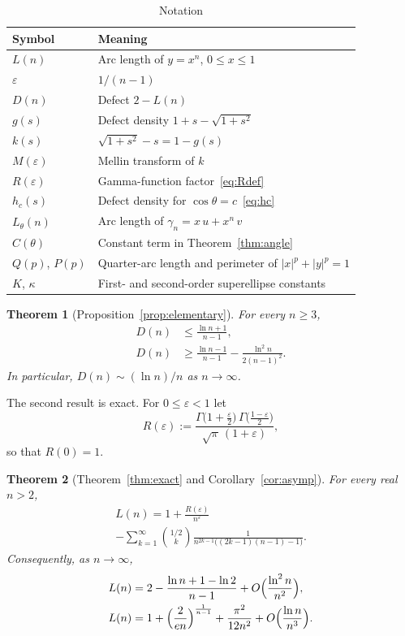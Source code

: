 \documentclass[journal]{IEEEtran}
\newtheorem{mainthm}{Theorem}
\newcommand{\eps}{\varepsilon}
\begin{document}
\begin{table}[!t]
\caption{Notation}
\label{tab:notation}
\centering
\renewcommand{\arraystretch}{1.2}
\begin{tabular}{@{}ll@{}}
\toprule
Symbol & Meaning\\
\midrule
$L(n)$ & Arc length of $y=x^n$, $0\le x\le1$\\
$\eps$ & $1/(n-1)$\\
$D(n)$ & Defect $2-L(n)$\\
$g(s)$ & Defect density $1+s-\sqrt{1+s^2}$\\
$k(s)$ & $\sqrt{1+s^2}-s=1-g(s)$\\
$M(\eps)$ & Mellin transform of $k$\\
$R(\eps)$ & Gamma-function factor~\eqref{eq:Rdef}\\
$h_c(s)$ & Defect density for $\cos\theta=c$~\eqref{eq:hc}\\
$L_\theta(n)$ & Arc length of $\gamma_n=x\,u+x^n\,v$\\
$C(\theta)$ & Constant term in Theorem~\ref{thm:angle}\\
$Q(p)$, $P(p)$ & Quarter-arc length and perimeter of $|x|^p+|y|^p=1$\\
$K$, $\kappa$ & First- and second-order superellipse constants\\
\bottomrule
\end{tabular}
\end{table}


\begin{mainthm}[Proposition~\ref{prop:elementary}]\label{thmA}
For every $n\ge3$,
\begin{align*}
  D(n)&\le\frac{\ln n+1}{n-1},\\
  D(n)&\ge\frac{\ln n-1}{n-1}-\frac{\ln^2n}{2(n-1)^2}.
\end{align*}
In particular, $D(n)\sim(\ln n)/n$ as $n\to\infty$.
\end{mainthm}

The second result is exact. For $0\le\eps<1$ let
\begin{equation}\label{eq:Rdef}
  R(\eps):=\frac{\Gamma\bigl(1+\frac{\eps}{2}\bigr)\,\Gamma\bigl(\frac{1-\eps}{2}\bigr)}
  {\sqrt\pi\,(1+\eps)},
\end{equation}
so that $R(0)=1$.

\begin{mainthm}[Theorem~\ref{thm:exact} and Corollary~\ref{cor:asymp}]\label{thmB}
For every real $n>2$,
\begin{multline}\label{eq:exact-intro}
  L(n)=1+\frac{R(\eps)}{n^{\eps}}\\
  -\sum_{k=1}^{\infty}\binom{1/2}{k}\frac{1}{n^{2k-1}\bigl((2k-1)(n-1)-1\bigr)}.
\end{multline}
Consequently, as $n\to\infty$,
\begin{align}
  L(n)&=2-\frac{\ln n+1-\ln2}{n-1}+O\Bigl(\frac{\ln^2n}{n^2}\Bigr),\label{eq:asy1}\\
  L(n)&=1+\Bigl(\frac{2}{en}\Bigr)^{\frac{1}{n-1}}+\frac{\pi^2}{12n^2}
        +O\Bigl(\frac{\ln n}{n^3}\Bigr).\label{eq:asy2}
\end{align}
\end{mainthm}
\end{document}
